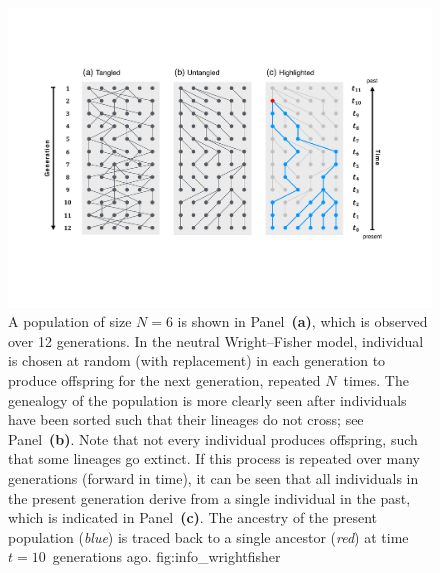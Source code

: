 

\begin{figure}[!htb]
\includegraphics[width=\textwidth]{./img/ch1/info_wrightfisher}
{A population of size ${N=6}$ is shown in Panel~\textbf{(a)}, which is observed over 12 generations.
In the neutral Wright–Fisher model,  individual is chosen at random (with replacement) in each generation to produce offspring for the next generation, repeated $N$~times.
The genealogy of the population is more clearly seen after individuals have been sorted such that their lineages do not cross; see Panel~\textbf{(b)}.
Note that not every individual produces offspring, such that some lineages go extinct.
If this process is repeated over many generations (forward in time), it can be seen that all individuals in the present generation derive from a single individual in the past, which is indicated in Panel~\textbf{(c)}.
The ancestry of the present population (\emph{blue}) is traced back to a single ancestor (\emph{red}) at time ${t=10}$~generations ago.}
{fig:info_wrightfisher}
\end{figure}
